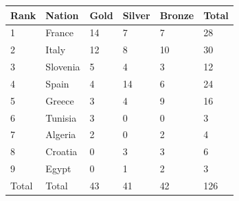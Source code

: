 \documentclass{article}
\begin{document}
\begin{tabular}{llllll}
\toprule
Rank & Nation & Gold & Silver & Bronze & Total \\
\midrule
1 & France & 14 & 7 & 7 & 28 \\
2 & Italy & 12 & 8 & 10 & 30 \\
3 & Slovenia & 5 & 4 & 3 & 12 \\
4 & Spain & 4 & 14 & 6 & 24 \\
5 & Greece & 3 & 4 & 9 & 16 \\
6 & Tunisia & 3 & 0 & 0 & 3 \\
7 & Algeria & 2 & 0 & 2 & 4 \\
8 & Croatia & 0 & 3 & 3 & 6 \\
9 & Egypt & 0 & 1 & 2 & 3 \\
Total & Total & 43 & 41 & 42 & 126 \\
\bottomrule
\end{tabular}
\end{document}
